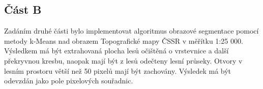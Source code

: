 \subsection*{Část B}
Zadáním druhé části bylo implementovat algoritmus obrazové segmentace pomocí metody k-Means nad obrazem Topografické mapy ČSSR v měřítku 1:25 000. Výsledkem má být extrahovaná plocha lesů očištěná o vrstevnice a další překryvnou kresbu, naopak mají být z lesů odečteny lesní průseky. Otvory v lesním prostoru větší než 50 pixelů mají být zachovány. Výsledek má být odevzdán jako pole pixelových souřadnic.